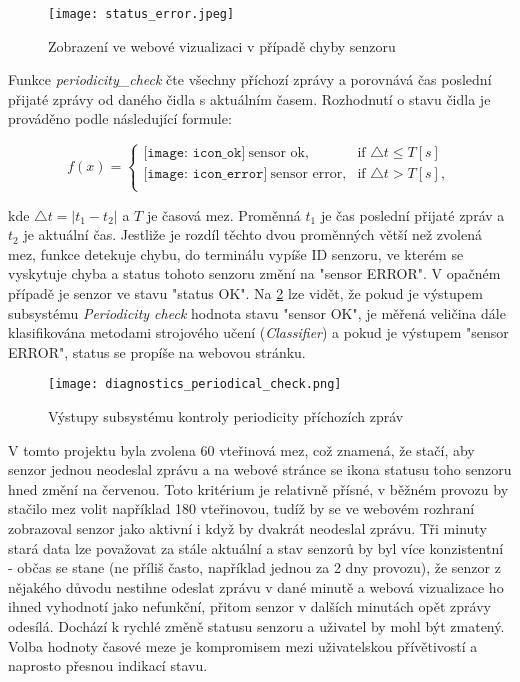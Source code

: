 \begin{figure}[H]
  \centering
  \texttt{[image: status\_error.jpeg]}
  \caption{Zobrazení ve webové vizualizaci v případě chyby senzoru}
  \label{fig:status_error}
\end{figure} 

Funkce \textit{periodicity\_check} čte všechny příchozí zprávy a porovnává čas poslední přijaté zprávy od daného čidla s aktuálním časem. Rozhodnutí o stavu čidla je prováděno podle následující formule: 

\[
    f(x)= 
\begin{cases}
    {\texttt{[image: icon\_ok]}} \ \text{sensor ok}, & \text{if }  \triangle t \leq T [s]\\
    {\texttt{[image: icon\_error]}} \ \text{sensor error}, & \text{if }  \triangle t > T [s],  \\
\end{cases}
\]

kde \( \triangle t = |t_1 - t_2| \) a $T$ je časová mez. Proměnná $t_1$ je čas poslední přijaté zpráv a $t_2$ je aktuální čas. Jestliže je rozdíl těchto dvou proměnných větší než zvolená mez, funkce detekuje chybu, do terminálu vypíše ID senzoru, ve kterém se vyskytuje chyba a status tohoto senzoru změní na "sensor ERROR". V opačném případě je senzor ve stavu "status OK". Na \cref{fig:diagnostics_periodical_check} lze vidět, že pokud je výstupem subsystému \textit{Periodicity check} hodnota stavu "sensor OK", je měřená veličina dále klasifikována metodami strojového učení (\textit{Classifier}) a pokud je výstupem "sensor ERROR", status se propíše na webovou stránku.

\begin{figure}[H]
  \centering
  \texttt{[image: diagnostics\_periodical\_check.png]}
  \caption{Výstupy subsystému kontroly periodicity příchozích zpráv}
  \label{fig:diagnostics_periodical_check}
\end{figure} 

V tomto projektu byla zvolena 60 vteřinová mez, což znamená, že stačí, aby senzor jednou neodeslal zprávu a na webové stránce se ikona statusu toho senzoru hned změní na červenou. Toto kritérium je relativně přísné, v běžném provozu by stačilo mez volit například 180 vteřinovou, tudíž by se ve webovém rozhraní zobrazoval senzor jako aktivní i když by dvakrát neodeslal zprávu. Tři minuty stará data lze považovat za stále aktuální a stav senzorů by byl více konzistentní - občas se stane (ne příliš často, například jednou za 2 dny provozu), že senzor z nějakého důvodu nestihne odeslat zprávu v dané minutě a webová vizualizace ho ihned vyhodnotí jako nefunkční, přitom senzor v dalších minutách opět zprávy odesílá. Dochází k rychlé změně statusu senzoru a uživatel by mohl být zmatený. Volba hodnoty časové meze je kompromisem mezi uživatelskou přívětivostí a naprosto přesnou indikací stavu. 

